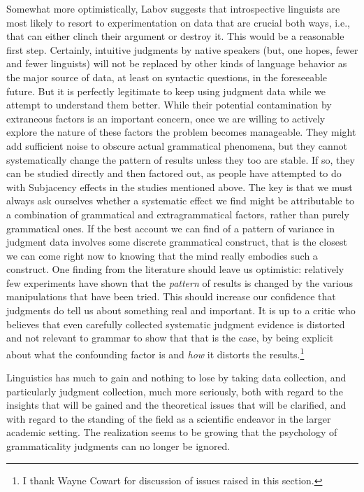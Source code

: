  Somewhat more optimistically, Labov suggests that introspective linguists are most likely to resort to experimentation on data that are crucial both ways, i.e., that can either clinch their argument or destroy it. This would be a reasonable first step. Certainly, intuitive judgments by native speakers (but, one hopes, fewer and fewer linguists) will not be replaced by other kinds of language behavior as the
 major source of data, at least on syntactic questions, in the foreseeable future. But it is perfectly legitimate to keep using judgment data while we attempt to understand them better. While their potential contamination by extraneous factors is an important concern, once we are willing to actively explore the nature of these factors the problem becomes manageable. They might add sufficient noise to obscure actual grammatical phenomena, but they cannot systematically change the pattern of results unless they too are stable. If so, they can be studied directly and then factored out, as people have attempted to do with Subjacency effects in the studies mentioned above. The key is that we must always ask ourselves whether a systematic effect we find might be attributable to a combination of grammatical and extragrammatical factors, rather than purely grammatical ones. If the best account we can find of a pattern of variance in judgment data involves some discrete grammatical construct, that is the closest we can come right now to knowing that the mind really embodies such a construct. One finding from the literature should leave us optimistic: relatively few experiments have shown that the \textit{pattern} of results is changed by the various manipulations that have been tried. This should increase our confidence that judgments do tell us about something real and important. It is up to a critic who believes that even carefully collected systematic judgment evidence is distorted and not relevant to grammar to show that that is the case, by being explicit about what the confounding factor is and \textit{how} it distorts the results.\footnote{I thank Wayne Cowart for discussion of issues raised in this section.}


 Linguistics has much to gain and nothing to lose by taking data collection, and particularly judgment collection, much more seriously, both with regard to the insights that will be gained and the theoretical issues that will be clarified, and with regard to the standing of the field as a scientific endeavor in the larger academic setting. The realization seems to be growing that the psychology of grammaticality judgments can no longer be ignored.


